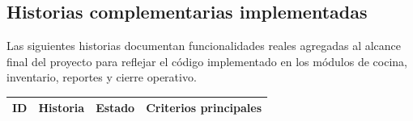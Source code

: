 \subsection{Historias complementarias implementadas}

Las siguientes historias documentan funcionalidades reales agregadas al alcance
final del proyecto para reflejar el código implementado en los módulos de cocina,
inventario, reportes y cierre operativo.

\begin{longtable}{|>{\bfseries}p{1.5cm}|p{5.2cm}|p{2.2cm}|p{5cm}|}
\hline
\rowcolor{huorange}
\color{white}\bfseries ID & \color{white}\bfseries Historia & \color{white}\bfseries Estado & \color{white}\bfseries Criterios principales \\
\hline
\endhead


\end{longtable}
